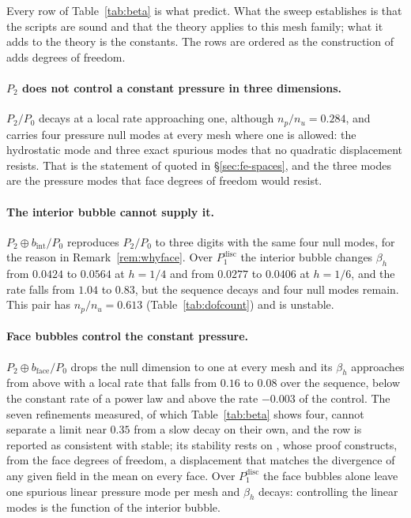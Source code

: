 \documentclass[11pt]{article}
\theoremstyle{definition}
\theoremstyle{plain}
\begin{document}
Every row of Table~\ref{tab:beta} is what \citet{BoffiBrezziFortin:2013}
predict. What the sweep establishes is that the scripts are sound and that the theory
applies to this mesh family; what it adds to the theory is the constants. The
rows are ordered as the construction of
\citet[Example~8.7.2]{BoffiBrezziFortin:2013} adds degrees of freedom.

\paragraph{$P_2$ does not control a constant pressure in three dimensions.}
$P_2/P_0$ decays at a local rate approaching one, although $n_p/n_u = 0.284$,
and carries four pressure null modes
at every mesh where one is allowed: the hydrostatic mode and three exact
spurious modes that no quadratic displacement resists. That is the statement
of \citet[\S8.7]{BoffiBrezziFortin:2013} quoted in \S\ref{sec:fe-spaces}, and
the three modes are the pressure modes that face degrees of freedom would
resist.

\paragraph{The interior bubble cannot supply it.} $P_2 \oplus
b_{\mathrm{int}}/P_0$ reproduces $P_2/P_0$ to three digits with the same four
null modes, for the reason in Remark~\ref{rem:whyface}. Over
$P_1^{\mathrm{disc}}$ the interior bubble changes $\beta_h$ from $0.0424$ to
$0.0564$ at $h = 1/4$ and from $0.0277$ to $0.0406$ at $h = 1/6$, and the
rate falls from $1.04$ to $0.83$, but the sequence decays and four null modes
remain. This pair has $n_p/n_u = 0.613$ (Table~\ref{tab:dofcount}) and is
unstable.

\paragraph{Face bubbles control the constant pressure.} $P_2 \oplus
b_{\mathrm{face}}/P_0$ drops the null dimension to one at every mesh and its
$\beta_h$ approaches from above with a local rate that falls from $0.16$ to
$0.08$ over the sequence, below the constant rate of a power law and above the
rate $-0.003$ of the control.
The seven refinements measured, of which Table~\ref{tab:beta} shows four,
cannot separate a limit near $0.35$ from a slow decay on their own, and the
row is reported as consistent with stable; its
stability rests on \citet[Example~8.7.2]{BoffiBrezziFortin:2013}, whose proof
constructs, from the face degrees of freedom, a displacement that matches the
divergence of any given field in the mean on every face.
Over $P_1^{\mathrm{disc}}$ the face bubbles alone leave one spurious linear
pressure mode per mesh and $\beta_h$ decays: controlling the linear modes is
the function of the interior bubble.
\end{document}
